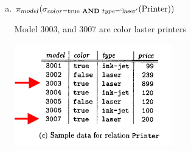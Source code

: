 \documentclass[12pt]{article}
\begin{document}
\begin{enumerate}
\begin{enumerate}[a)]
        \item $\pi_{model} (\sigma_{color = \text{true} \textbf{ AND } type=`\text{laser}'}(\text{Printer}))$

        \bigskip

        Model 3003, and 3007 are color laster printers

        \begin{center}
        \includegraphics[width=\linewidth]{images/worksheet_2_solution_9.png}
        \end{center}


    \end{enumerate}
\end{enumerate}
\end{document}

